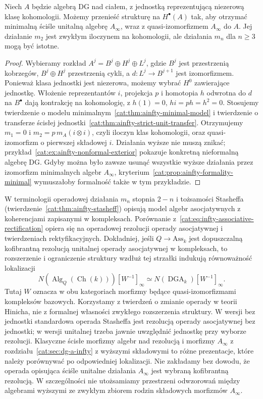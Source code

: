 \begin{stwierdzenie}\label{cat:prop:infty-ainfty-model}
Niech $A$ będzie algebrą DG nad ciałem, z jednostką reprezentującą niezerową klasę kohomologii. Możemy przenieść strukturę na $H^\bullet(A)$ tak, aby otrzymać minimalną ściśle unitalną algebrę $A_\infty$, wraz z quasi-izomorfizmem $A_\infty$ do $A$. Jej działanie $m_2$ jest zwykłym iloczynem na kohomologii, ale działania $m_n$ dla $n\geq3$ mogą być istotne.
\end{stwierdzenie}
\begin{proof}
Wybieramy rozkład $A^j=B^j\oplus H^j\oplus L^j$, gdzie $B^j$ jest przestrzenią kobrzegów, $B^j\oplus H^j$ przestrzenią cykli, a $d:L^j\to B^{j+1}$ jest izomorfizmem. Ponieważ klasa jednostki jest niezerowa, możemy wybrać $H^0$ zawierające jednostkę. Włożenie reprezentantów $i$, projekcja $p$ i homotopia $h$ odwrotna do $d$ na $B^\bullet$ dają kontrakcję na kohomologię, z $h(1)=0$, $hi=ph=h^2=0$. Stosujemy twierdzenie o modelu minimalnym~\ref{cat:thm:ainfty-minimal-model} i twierdzenie o transferze ścisłej jednostki~\ref{cat:thm:ainfty-strict-unit-transfer}. Otrzymujemy $m_1=0$ i $m_2=p\,m_A(i\otimes i)$, czyli iloczyn klas kohomologii, oraz quasi-izomorfizm o pierwszej składowej $i$. Działania wyższe nie muszą znikać; przykład~\ref{cat:ex:ainfty-nonformal-exterior} pokazuje konkretną nieformalną algebrę DG. Gdyby można było zawsze usunąć wszystkie wyższe działania przez izomorfizm minimalnych algebr $A_\infty$, kryterium~\ref{cat:prop:ainfty-formality-minimal} wymuszałoby formalność także w tym przykładzie.
\end{proof}

W terminologii operadowej działania $m_n$ stopnia $2-n$ i tożsamości Stasheffa (twierdzenie~\ref{cat:thm:ainfty-stasheff}) opisują model algebr asocjatywnych z koherencjami zapisanymi w kompleksach. Porównanie z~\eqref{cat:eq:infty-associative-rectification} opiera się na operadowej rezolucji operady asocjatywnej i twierdzeniach rektyfikacyjnych. Dokładniej, jeśli $Q\to\mathrm{Ass}_k$ jest dopuszczalną kofibrantną rezolucją unitalnej operady asocjatywnej w kompleksach, to rozszerzenie i ograniczenie struktury wzdłuż tej strzałki indukują równoważność lokalizacji
\[
 N(\operatorname{Alg}_{Q}(\operatorname{Ch}(k)))[W^{-1}]_\infty
 \simeq N(\operatorname{DGA}_k)[W^{-1}]_\infty.
\]
Tutaj $W$ oznacza w obu kategoriach morfizmy będące quasi-izomorfizmami kompleksów bazowych. Korzystamy z twierdzeń o zmianie operady w teorii Hinicha, nie z formalnej własności zwykłego rozszerzenia struktury. W wersji bez jednostki standardowa operada Stasheffa jest rezolucją operady asocjatywnej bez jednostki; w wersji unitalnej trzeba jawnie uwzględnić jednostkę przy wyborze rezolucji. Klasyczne ścisłe morfizmy algebr nad rezolucją i morfizmy $A_\infty$ z rozdziału~\ref{cat:sec:dg-a-infty} z wyższymi składowymi to różne prezentacje, które należy porównywać po odpowiedniej lokalizacji. Nie zakładamy bez dowodu, że operada opisująca ściśle unitalne działania $A_\infty$ jest wybraną kofibrantną rezolucją. W szczególności nie utożsamiamy przestrzeni odwzorowań między algebrami wyższymi ze zwykłym zbiorem rodzin składowych morfizmów $A_\infty$.

